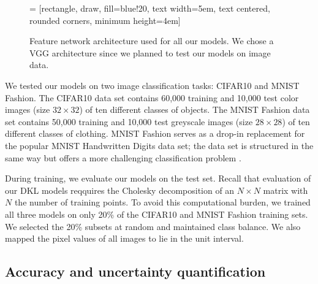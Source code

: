 \documentclass{article}
\begin{document}
\begin{figure}
\centering
{} = [rectangle, draw, fill=blue!20,
    text width=5em, text centered, rounded corners, minimum height=4em]
\caption{\label{fig-vgg} Feature network architecture used for all our models. We chose a VGG architecture since we planned to test our models on image data.}
\end{figure}

We tested our models on two image classification tasks: CIFAR10 and MNIST Fashion. The CIFAR10 data set contains 60,000 training and 10,000 test color images (size $32\times 32$) of ten different classes of objects. The MNIST Fashion data set contains 50,000 training and 10,000 test greyscale images (size $28\times 28$) of ten different classes of clothing. MNIST Fashion serves as a drop-in replacement for the popular MNIST Handwritten Digits data set; the data set is structured in the same way but offers a more challenging classification problem \cite{xiao2017fashion}.

During training, we evaluate our models on the test set. Recall that evaluation of our DKL models reqquires the Cholesky decomposition of an $N\times N$ matrix with $N$ the number of training points. To avoid this computational burden, we trained all three models on only 20\% of the CIFAR10 and MNIST Fashion training sets. We selected the 20\% subsets at random and maintained class balance. We also mapped the pixel values of all images to lie in the unit interval.

\subsection{Accuracy and uncertainty quantification}
\end{document}
